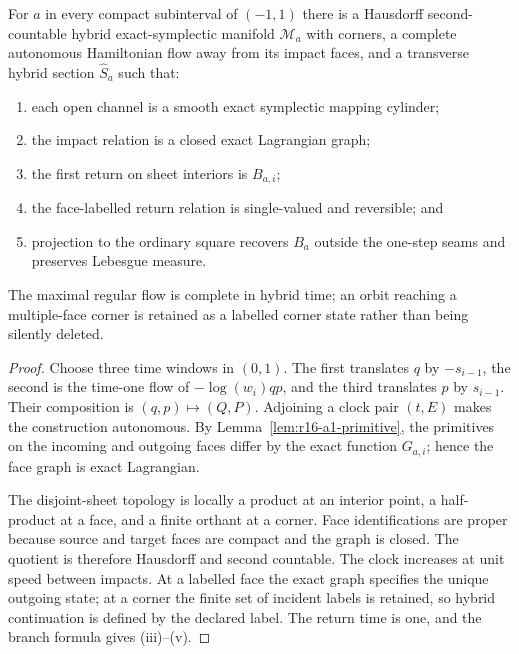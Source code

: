 \begin{theorem}
\label{thm:r16-a1-hybrid}
For \(a\) in every compact subinterval of \((-1,1)\) there is a Hausdorff
second-countable hybrid exact-symplectic manifold
\(\mathcal M_a\) with corners, a complete autonomous Hamiltonian flow away
from its impact faces, and a transverse hybrid section \(\widehat S_a\) such
that:
\begin{enumerate}[label=(\roman*)]
\item each open channel is a smooth exact symplectic mapping cylinder;
\item the impact relation is a closed exact Lagrangian graph;
\item the first return on sheet interiors is \(B_{a,i}\);
\item the face-labelled return relation is single-valued and reversible; and
\item projection to the ordinary square recovers \(B_a\) outside the
      one-step seams and preserves Lebesgue measure.
\end{enumerate}
The maximal regular flow is complete in hybrid time; an orbit reaching a
multiple-face corner is retained as a labelled corner state rather than being
silently deleted.
\end{theorem}

\begin{proof}
Choose three time windows in \((0,1)\).  The first translates \(q\) by
\(-s_{i-1}\), the second is the time-one flow of
\(-\log(w_i)qp\), and the third translates \(p\) by \(s_{i-1}\).
Their composition is \((q,p)\mapsto(Q,P)\).  Adjoining a clock pair
\((t,E)\) makes the construction autonomous.  By
Lemma~\ref{lem:r16-a1-primitive}, the primitives on the incoming and outgoing
faces differ by the exact function \(G_{a,i}\); hence the face graph is exact
Lagrangian.

The disjoint-sheet topology is locally a product at an interior point, a
half-product at a face, and a finite orthant at a corner.  Face identifications
are proper because source and target faces are compact and the graph is
closed.  The quotient is therefore Hausdorff and second countable.  The clock
increases at unit speed between impacts.  At a labelled face the exact graph
specifies the unique outgoing state; at a corner the finite set of incident
labels is retained, so hybrid continuation is defined by the declared label.
The return time is one, and the branch formula gives (iii)--(v).
\end{proof}

